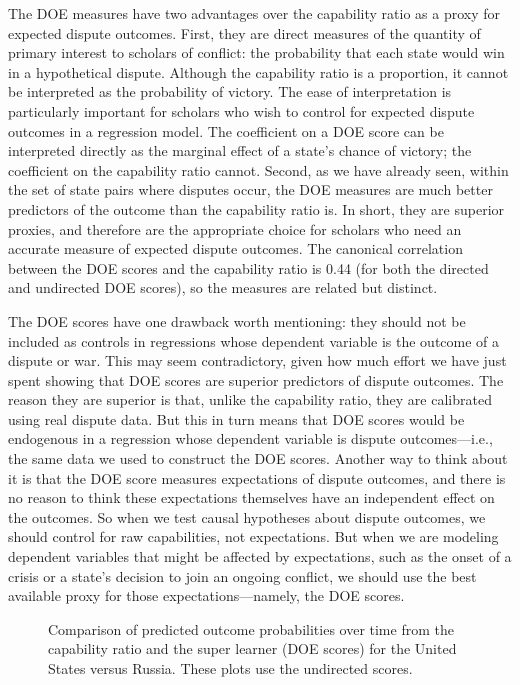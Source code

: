 The DOE measures have two advantages over the capability ratio as a proxy for expected dispute outcomes.
First, they are direct measures of the quantity of primary interest to scholars of conflict: the probability that each state would win in a hypothetical dispute.
Although the capability ratio is a proportion, it cannot be interpreted as the probability of victory.
The ease of interpretation is particularly important for scholars who wish to control for expected dispute outcomes in a regression model.
The coefficient on a DOE score can be interpreted directly as the marginal effect of a state's chance of victory; the coefficient on the capability ratio cannot.
Second, as we have already seen, within the set of state pairs where disputes occur, the DOE measures are much better predictors of the outcome than the capability ratio is.
In short, they are superior proxies, and therefore are the appropriate choice for scholars who need an accurate measure of expected dispute outcomes.
The canonical correlation between the DOE scores and the capability ratio is 0.44 (for both the directed and undirected DOE scores), so the measures are related but distinct.

The DOE scores have one drawback worth mentioning: they should not be included as controls in regressions whose dependent variable is the outcome of a dispute or war.
This may seem contradictory, given how much effort we have just spent showing that DOE scores are superior predictors of dispute outcomes.
The reason they are superior is that, unlike the capability ratio, they are calibrated using real dispute data.
But this in turn means that DOE scores would be endogenous in a regression whose dependent variable is dispute outcomes---i.e., the same data we used to construct the DOE scores.
Another way to think about it is that the DOE score measures expectations of dispute outcomes, and there is no reason to think these expectations themselves have an independent effect on the outcomes.
So when we test causal hypotheses about dispute outcomes, we should control for raw capabilities, not expectations.
But when we are modeling dependent variables that might be affected by expectations, such as the onset of a crisis or a state's decision to join an ongoing conflict, we should use the best available proxy for those expectations---namely, the DOE scores.

\begin{figure}[tp]
  \centering
  
  \vspace{-2em}
  \caption{
    Comparison of predicted outcome probabilities over time from the capability ratio and the super learner (DOE scores) for the United States versus Russia.
    These plots use the undirected scores.
  }
  \label{fig:vs}
\end{figure}

